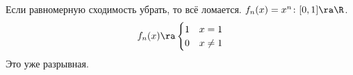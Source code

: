 \begin{exmp}
	Если равномерную сходимость убрать, то всё ломается.
	$f_n(x) = x^n\colon [0, 1] \ra \R$.
	\[ f_n(x) \ra \begin{cases} 1 & x = 1 \\ 0 & x \ne 1 \end{cases} \]
	Это уже разрывная.
\end{exmp}
